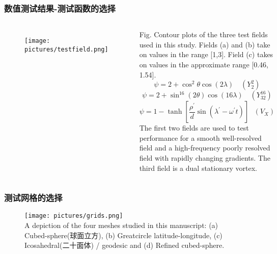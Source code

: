 \documentclass[unknownkeysallowed]{beamer}
\begin{document}
\begin{spacing}{1.2}
\begin{frame}
\frametitle{数值测试结果-测试函数的选择}
\begin{columns}[c]
\begin{figure}[c]
\texttt{[image: pictures/testfield.png]}

\end{figure}

\tiny{Fig. Contour plots of the three test fields used in this study. Fields (a) and (b) take on values in
the range [1,3]. Field (c) takes on values in the approximate range [0.46, 1.54].}
$$\psi = 2 + \cos^2 \theta \cos(2 \lambda) \quad (Y^2_2)$$
$$\psi = 2 + \sin^{16}(2 \theta) \cos(16 \lambda) \quad (Y^{16}_{32})$$
$$\psi = 1 - \tanh \left[ \frac{\rho^\prime}{d} \sin(\lambda^\prime - \omega^\prime t) \right]\text{  }(V_X)$$
$$$$
The first two fields are used to test performance for a \textcolor[rgb]{0,0,1}{smooth well-resolved field} and a \textcolor[rgb]{0,0,1}{high-frequency
poorly resolved field} with rapidly changing gradients. The third field is a \textcolor[rgb]{0,0,1}{dual stationary vortex}.
$$$$
\end{columns}
\end{frame}

\begin{frame}
\frametitle{测试网格的选择}
\begin{figure}[c]
\texttt{[image: pictures/grids.png]}\\
\tiny{A depiction of the four meshes studied in this manuscript: (a) Cubed-sphere(球面立方), (b) Greatcircle
latitude-longitude, (c) Icosahedral(二十面体) / geodesic and (d) Refined cubed-sphere.}
\end{figure}

\end{frame}


\end{spacing}
\end{document}
